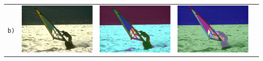 \begin{table}[h!]
\begin{tabularx}{\textwidth}{>{\centering}m{}
			>{\centering}m{}
			>{\centering}m{}
			>{\centering}m{}
			>{\centering\arraybackslash}m{}}
		\texttt{b)} &
		\includegraphics[width=0.9\linewidth]{images/bsd/62096.jpg} &
		\includegraphics[width=0.9\linewidth]{images/gen/bsd_results/62096.jpg_seg.png} &
		\includegraphics[width=0.9\linewidth]{images/gen/bsd_results/62096.jpg_gt_0.png} \\
		

\end{tabularx}
\end{table}
